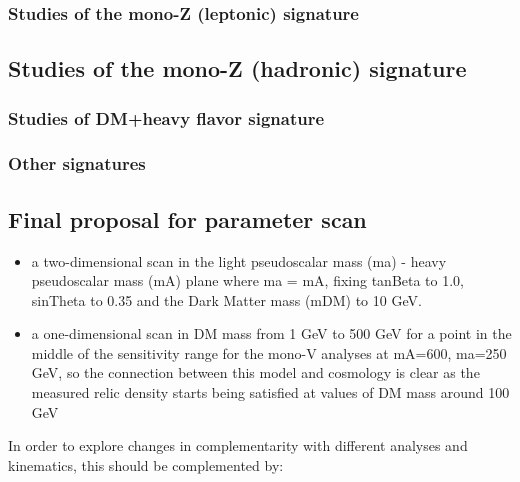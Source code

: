 \subsubsection{Studies of the mono-Z (leptonic) signature}

\FloatBarrier
\subsection{Studies of the mono-Z (hadronic) signature}


\subsubsection{Studies of DM+heavy flavor signature}


\subsubsection{Other signatures}


\subsection{Final proposal for parameter scan}

\begin{itemize}

\item a two-dimensional scan in the light pseudoscalar mass (ma) -
heavy pseudoscalar mass (mA) plane where ma = mA, fixing tanBeta to 1.0,
sinTheta to 0.35 and the Dark Matter mass (mDM) to 10 GeV.


\item a one-dimensional scan in DM mass from 1 GeV to 500 GeV for a
point in the middle of the sensitivity range for the mono-V analyses at
mA=600, ma=250 GeV, so the connection between this model and cosmology
is clear as the measured relic density starts being satisfied at values
of DM mass around 100 GeV

\end{itemize}


In order to explore changes in complementarity with different
analyses and kinematics, this should be complemented by:

